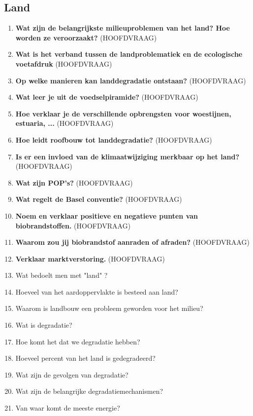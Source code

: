 \documentclass[a4paper,12pt]{article}
\begin{document}
    \subsection{Land}
    \begin{enumerate}
        \item \textbf{Wat zijn de belangrijkste milieuproblemen van het land? Hoe worden ze veroorzaakt?} (HOOFDVRAAG)
        \item \textbf{Wat is het verband tussen de landproblematiek en de ecologische voetafdruk} (HOOFDVRAAG)
        \item \textbf{Op welke manieren kan landdegradatie ontstaan?} (HOOFDVRAAG)
        \item \textbf{Wat leer je uit de voedselpiramide?} (HOOFDVRAAG)
        \item \textbf{Hoe verklaar je de verschillende opbrengsten voor woestijnen, estuaria, ...} (HOOFDVRAAG)
        \item \textbf{Hoe leidt roofbouw tot landdegradatie?} (HOOFDVRAAG)
        \item \textbf{Is er een invloed van de klimaatwijziging merkbaar op het land?} (HOOFDVRAAG)
        \item \textbf{Wat zijn POP's?} (HOOFDVRAAG)
        \item \textbf{Wat regelt de Basel conventie?} (HOOFDVRAAG)
        \item \textbf{Noem en verklaar positieve en negatieve punten van biobrandstoffen.} (HOOFDVRAAG)
        \item \textbf{Waarom zou jij biobrandstof aanraden of afraden?} (HOOFDVRAAG)
        \item \textbf{Verklaar marktverstoring.} (HOOFDVRAAG)
        \item Wat bedoelt men met "land" ?
        \item Hoeveel van het aardoppervlakte is besteed aan land? 
        \item Waarom is landbouw een probleem geworden voor het milieu?
        \item Wat is degradatie?
        \item Hoe komt het dat we degradatie hebben?
        \item Hoeveel percent van het land is gedegradeerd?
        \item Wat zijn de gevolgen van degradatie?
        \item Wat zijn de belangrijke degradatiemechanismen?
        \item Van waar komt de meeste energie?

\end{enumerate}
\end{document}
